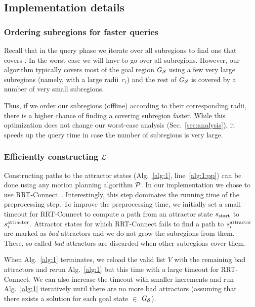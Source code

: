 \documentclass[a4paper,10pt]{article}
\begin{document}
\subsection{Implementation details}
\label{subsec:impl}

\subsubsection{Ordering subregions for faster queries}
Recall that in the query phase we iterate over all subregions to find one that covers \sGoal. 
In the worst case we will have to go over all subregions.
However,  our algorithm typically covers most of the goal region $G_\mathcal{S}$ using a few very large subregions (namely, with a large radii~$r_i$) and the rest of $G_\mathcal{S}$ is covered by a number of very small subregions.

Thus, if we order our subregions (offline) according to their corresponding radii, there is a higher chance of finding a covering subregion faster. While this optimization does not change our worst-case analysis (Sec.~\ref{sec:analysis}), it speeds up the query time in case the number of subregions is very large.

\subsubsection{Efficiently constructing $\mathcal{L}$}
Constructing paths to the attractor states (Alg.~\ref{alg:1}, line~\ref{alg:1:pp}) can be done using any motion planning algorithm $\mathcal{P}$.
In our implementation we chose to use RRT-Connect~\cite{KL00}.
Interestingly, this step dominates the running time of the preprocessing step.
%
To improve the preprocessing time, we initially set a small timeout for RRT-Connect to compute a path from an attractor state $s_{\textrm{start}}$ to $s^{\text{attractor}}_i$.
Attractor states for which RRT-Connect fails to find a path to $s^{\text{attractor}}_i$ are marked as \textit{bad} attractors and we do not grow the subregions from them. 
These, so-called \textit{bad} attractors are discarded when other subregions cover them.

When Alg.~\ref{alg:1} terminates, we reload the valid list $V$ with the remaining bad attractors and rerun Alg.~\ref{alg:1} but this time with a large timeout for RRT-Connect. 
%
We can also increase the timeout with smaller increments and run Alg.~\ref{alg:1} iteratively until there are no more bad attractors (assuming that there exists a solution for each goal state $\in$ $G_\mathcal{S}$).
\end{document}
